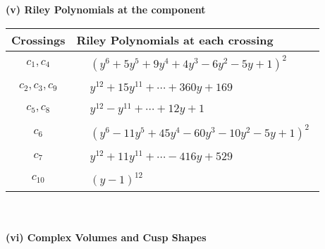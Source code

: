 \documentclass[1p]{elsarticle_modified}
\theoremstyle{definition}
\begin{document}
\newpage\renewcommand{\arraystretch}{1}
\flushleft \textbf{(v) Riley Polynomials at the component}\newline \\
\begin{tabular}{m{50pt}|m{274pt}}
Crossings & \hspace{64pt}Riley Polynomials at each crossing \\
\hline $$\begin{aligned}c_{1},c_{4}\end{aligned}$$&$\begin{aligned}
&(y^6+5 y^5+9 y^4+4 y^3-6 y^2-5 y+1)^2
\end{aligned}$\\
\hline $$\begin{aligned}c_{2},c_{3},c_{9}\end{aligned}$$&$\begin{aligned}
&y^{12}+15 y^{11}+\cdots+360 y+169
\end{aligned}$\\
\hline $$\begin{aligned}c_{5},c_{8}\end{aligned}$$&$\begin{aligned}
&y^{12}- y^{11}+\cdots+12 y+1
\end{aligned}$\\
\hline $$\begin{aligned}c_{6}\end{aligned}$$&$\begin{aligned}
&(y^6-11 y^5+45 y^4-60 y^3-10 y^2-5 y+1)^2
\end{aligned}$\\
\hline $$\begin{aligned}c_{7}\end{aligned}$$&$\begin{aligned}
&y^{12}+11 y^{11}+\cdots-416 y+529
\end{aligned}$\\
\hline $$\begin{aligned}c_{10}\end{aligned}$$&$\begin{aligned}
&(y-1)^{12}
\end{aligned}$\\
\hline
\end{tabular}\\~\\
\newpage\flushleft \textbf{(vi) Complex Volumes and Cusp Shapes}
\end{document}
